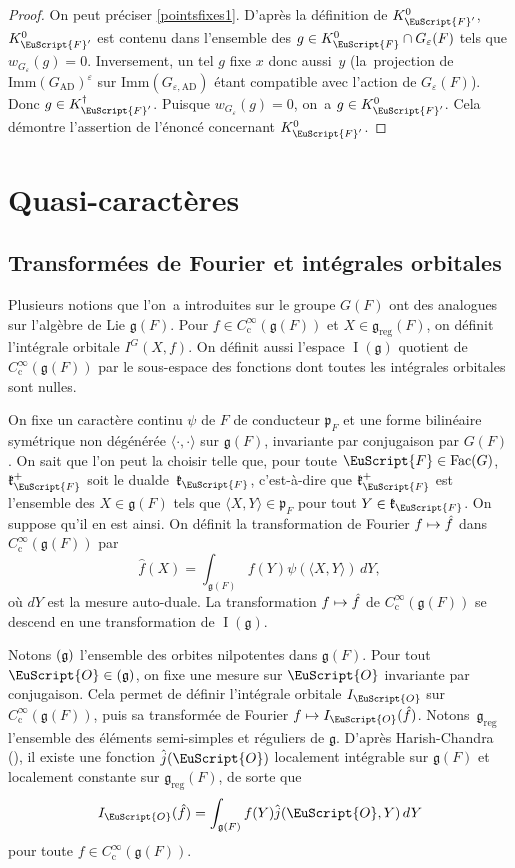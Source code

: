\documentclass[JEP,XML,SOM,Unicode,francais]{cedram}
\let\mathcal \EuScript
\newcommand{\NoChangel}[1]{%
\expandafter\let\csname old\string#1\endcsname=#1
\let#1=\relax
\newcommand{#1}{\mathcode`l="716C\csname old\string#1\endcsname\mathcode`l="7160 }%
}
\let\epsilon\varepsilon
\let\<\langle
\let\>\rangle
\newcommand\mto{\mathchoice{\longmapsto}{\mapsto}{\mapsto}{\mapsto}}
\newcommand{\frg}{\mathfrak{g}}
\newcommand{\frk}{\mathfrak{k}}
\newcommand{\frp}{\mathfrak{p}}
\newcommand{\AD}{\mathrm{AD}}
\newcommand{\rc}{\mathrm{c}}
\newcommand{\Fac}{\mathrm{Fac}}
\newcommand{\Imm}{\mathrm{Imm}}
\newcommand{\Nil}{\mathrm{Nil}} \NoChangel{\Nil}
\newcommand{\reg}{\mathrm{reg}}
\DeclareMathOperator{\rI}{I}
\newcommand{\cF}{\mathcal{F}}
\newcommand{\cO}{\mathcal{O}}
\theoremstyle{plain}
\theoremstyle{definition}
\begin{document}
\begin{proof}
On peut préciser \eqref{pointsfixes1}. D'après la définition de $K_{\cF'}^0$, $K_{\cF'}^0$ est contenu dans l'ensemble des $g\in K_{\cF}^0\cap G_{\epsilon}(F) $ tels que $w_{G_{\epsilon}}(g)=0$. Inversement, un tel $g$ fixe $x$ donc aussi~$y$ (la~projection de $\Imm(G_{\AD})^{\epsilon}$ sur $\Imm(G_{\epsilon,\AD})$ étant compatible avec l'action de $G_{\epsilon}(F)$). Donc $g\in K_{\cF'}^{\dag}$. Puisque $w_{G_{\epsilon}}(g)=0$, on~a $g\in K_{\cF'}^0$. Cela démontre l'assertion de l'énoncé concernant $K_{\cF'}^0$.
\end{proof}

\section{Quasi-caractères}
\subsection{Transformées de Fourier et intégrales orbitales}\label{transformees}
Plusieurs notions que l'on~a introduites sur le groupe $G(F)$ ont des analogues sur l'algèbre de Lie $\frg(F)$. Pour $f\in C_{\rc}^{\infty}(\frg(F))$ et $X\in \frg_{\reg}(F)$, on définit l'intégrale orbitale $I^G(X,f)$. On définit aussi l'espace $\rI(\frg)$ quotient de $C_{\rc}^{\infty}(\frg(F))$ par le sous-espace des fonctions dont toutes les intégrales orbitales sont nulles.

On fixe un caractère continu $\psi$ de $F$ de conducteur $\frp_{F}$ et une forme bilinéaire symétrique non dégénérée $\<{\cdot},{\cdot}\>$ sur $\frg(F)$, invariante par conjugaison par $G(F)$. On sait que l'on peut la choisir telle que, pour toute $\cF\in \Fac(G)$, $\frk_{\cF}^+$ soit le \og dual\fg de~$\frk_{\cF}$, c'est-à-dire que $\frk_{\cF}^+$ est l'ensemble des $X\in \frg(F)$ tels que $\<X,Y\>\in \frp_{F}$ pour tout $Y\in \frk_{\cF}$. On suppose qu'il en est ainsi. On définit la transformation de Fourier $f\mto \hat{f}$ dans $C_{\rc}^{\infty}(\frg(F))$ par
\[
\hat{f}(X)=\int_{\frg(F)}f(Y)\psi(\<X,Y\>)\,dY,
\]
où $dY$ est la mesure auto-duale. La transformation $f\mto \hat{f}$ de $C_{\rc}^{\infty}(\frg(F))$ se descend en une transformation de $\rI(\frg)$.

Notons $\Nil(\frg)$ l'ensemble des orbites nilpotentes dans $\frg(F)$. Pour tout $\cO\in \Nil(\frg)$, on fixe une mesure sur $\cO$ invariante par conjugaison. Cela permet de définir l'inté\-grale orbitale $I_{\cO}$ sur $C_{\rc}^{\infty}(\frg(F))$, puis sa transformée de Fourier $f\mto I_{\cO}(\hat{f})$. \hbox{Notons}~$\frg_{\reg}$ l'ensemble des éléments semi-simples et réguliers de $\frg$. D'après Harish-Chandra (\hbox{\cite[Th.\,4.4]{HC}}), il existe une fonction $\hat{j}(\cO)$ localement intégrable sur $\frg(F)$ et localement constante sur $\frg_{\reg}(F)$, de sorte que
\[
I_{\cO}(\hat{f})=\int_{\frg(F)}f(Y)\hat{j}(\cO,Y)\,dY
\]
pour toute $f\in C_{\rc}^{\infty}(\frg(F))$.
\end{document}
